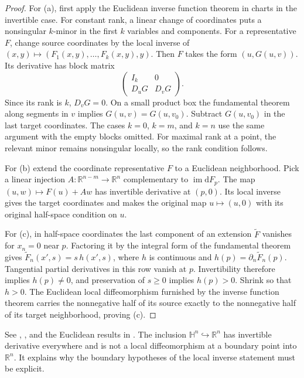 \documentclass[11pt,oneside,openany]{book}
\theoremstyle{definition}
\theoremstyle{remark}
\newcommand{\R}{\mathbb R}
\newcommand{\HH}{\mathbb H}
\newcommand{\dd}{\mathrm d}
\begin{document}
\begin{proof}
For (a), first apply the Euclidean inverse function
theorem in charts in the invertible case. For constant
rank, a linear change of coordinates puts a nonsingular
\(k\)-minor in the first \(k\) variables and components.
For a representative \(F\), change source coordinates
by the local inverse of
\((x,y)\mapsto(F_1(x,y),\ldots,F_k(x,y),y)\).
Then \(F\) takes the form \((u,G(u,v))\). Its derivative
has block matrix
\[
  \begin{pmatrix} I_k&0\\ D_uG&D_vG\end{pmatrix}.
\]
Since its rank is \(k\), \(D_vG=0\). On a small product
box the fundamental theorem along segments in \(v\)
implies \(G(u,v)=G(u,v_0)\). Subtract \(G(u,v_0)\) in the
last target coordinates. The cases \(k=0\), \(k=m\), and
\(k=n\) use the same argument with the empty blocks
omitted. For maximal rank at a point, the relevant minor
remains nonsingular locally, so the rank condition follows.

For (b) extend the coordinate representative \(F\) to a
Euclidean neighborhood. Pick a linear injection
\(A:\R^{n-m}\to\R^n\) complementary to
\(\operatorname{im}\dd F_p\). The map
\((u,w)\mapsto F(u)+Aw\) has invertible derivative at
\((p,0)\). Its local inverse gives the target
coordinates and makes the original map \(u\mapsto(u,0)\)
with its original half-space condition on \(u\).

For (c), in half-space coordinates the last component
of an extension \(\widetilde F\) vanishes for \(x_n=0\)
near \(p\). Factoring it by the integral form of the
fundamental theorem gives
\(\widetilde F_n(x',s)=s\,h(x',s)\), where \(h\) is
continuous and \(h(p)=\partial_n\widetilde F_n(p)\).
Tangential partial derivatives in this row vanish at
\(p\). Invertibility therefore implies \(h(p)\ne0\),
and preservation of \(s\geq0\) implies \(h(p)>0\).
Shrink so that \(h>0\). The Euclidean local
diffeomorphism furnished by the inverse function
theorem carries the nonnegative half of its source
exactly to the nonnegative half of its target
neighborhood, proving (c).
\end{proof}

See \cite[Theorems~4.5, 4.12, and 4.15]{lee},
\cite[Section~11 and Appendix~B]{tu}, and the Euclidean
results in \cite[Chapter~4]{d04}. The inclusion
\(\HH^n\hookrightarrow\R^n\) has invertible derivative
everywhere and is not a local diffeomorphism at a
boundary point into \(\R^n\). It explains why the
boundary hypotheses of the local inverse statement
must be explicit.
\end{document}
